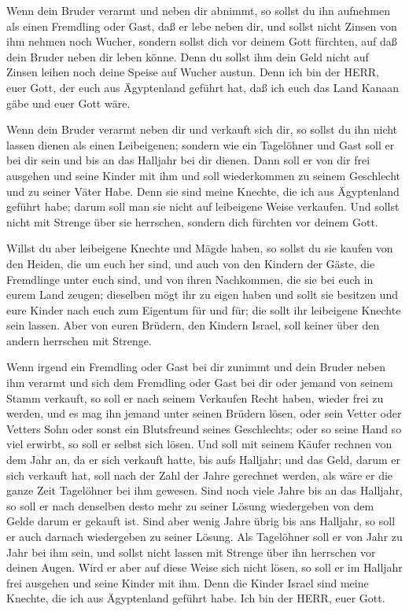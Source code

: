 Wenn dein Bruder verarmt und neben dir abnimmt, so sollst
du ihn aufnehmen als einen Fremdling oder Gast, daß er lebe neben dir,
 und sollst nicht Zinsen von ihm nehmen noch Wucher,
sondern sollst dich vor deinem Gott fürchten, auf daß dein Bruder neben
dir leben könne.  Denn du sollst ihm dein Geld nicht auf
Zinsen leihen noch deine Speise auf Wucher austun.  Denn
ich bin der HERR, euer Gott, der euch aus Ägyptenland geführt hat, daß
ich euch das Land Kanaan gäbe und euer Gott wäre.

 Wenn dein Bruder verarmt neben dir und verkauft sich dir,
so sollst du ihn nicht lassen dienen als einen Leibeigenen;
 sondern wie ein Tagelöhner und Gast soll er bei dir sein
und bis an das Halljahr bei dir dienen.  Dann soll er von
dir frei ausgehen und seine Kinder mit ihm und soll wiederkommen zu
seinem Geschlecht und zu seiner Väter Habe.  Denn sie sind
meine Knechte, die ich aus Ägyptenland geführt habe; darum soll man sie
nicht auf leibeigene Weise verkaufen.  Und sollst nicht mit
Strenge über sie herrschen, sondern dich fürchten vor deinem Gott.

 Willst du aber leibeigene Knechte und Mägde haben, so
sollst du sie kaufen von den Heiden, die um euch her sind, 
und auch von den Kindern der Gäste, die Fremdlinge unter euch sind, und
von ihren Nachkommen, die sie bei euch in eurem Land zeugen; dieselben
mögt ihr zu eigen haben  und sollt sie besitzen und eure
Kinder nach euch zum Eigentum für und für; die sollt ihr leibeigene
Knechte sein lassen. Aber von euren Brüdern, den Kindern Israel, soll
keiner über den andern herrschen mit Strenge.

 Wenn irgend ein Fremdling oder Gast bei dir zunimmt und
dein Bruder neben ihm verarmt und sich dem Fremdling oder Gast bei dir
oder jemand von seinem Stamm verkauft,  so soll er nach
seinem Verkaufen Recht haben, wieder frei zu werden, und es mag ihn
jemand unter seinen Brüdern lösen,  oder sein Vetter oder
Vetters Sohn oder sonst ein Blutsfreund seines Geschlechts; oder so
seine Hand so viel erwirbt, so soll er selbst sich lösen. 
Und soll mit seinem Käufer rechnen von dem Jahr an, da er sich verkauft
hatte, bis aufs Halljahr; und das Geld, darum er sich verkauft hat, soll
nach der Zahl der Jahre gerechnet werden, als wäre er die ganze Zeit
Tagelöhner bei ihm gewesen.  Sind noch viele Jahre bis an
das Halljahr, so soll er nach denselben desto mehr zu seiner Lösung
wiedergeben von dem Gelde darum er gekauft ist.  Sind aber
wenig Jahre übrig bis ans Halljahr, so soll er auch darnach wiedergeben
zu seiner Lösung.  Als Tagelöhner soll er von Jahr zu Jahr
bei ihm sein, und sollst nicht lassen mit Strenge über ihn herrschen vor
deinen Augen.  Wird er aber auf diese Weise sich nicht
lösen, so soll er im Halljahr frei ausgehen und seine Kinder mit ihm.
 Denn die Kinder Israel sind meine Knechte, die ich aus
Ägyptenland geführt habe. Ich bin der HERR, euer Gott.

